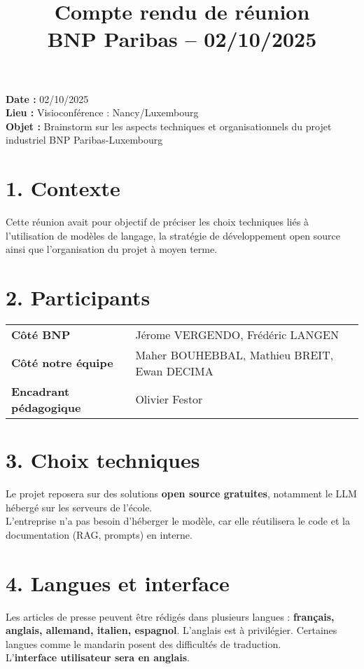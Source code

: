 \documentclass[a4paper,11pt]{article}
\title{\LARGE Compte rendu de réunion \\ \large BNP Paribas – 02/10/2025}
\date{}
\begin{document}
\maketitle

\begin{tcolorbox}[colback=blue!5!white,colframe=blue!75!black,title=Informations générales]
\textbf{Date :} 02/10/2025 \\
\textbf{Lieu :} Visioconférence : Nancy/Luxembourg \\
\textbf{Objet :} Brainstorm sur les aspects techniques et organisationnels du projet industriel BNP Paribas-Luxembourg
\end{tcolorbox}

\vspace{0.5cm}

\section*{1. Contexte}
Cette réunion avait pour objectif de préciser les choix techniques liés à l’utilisation de modèles de langage, la stratégie de développement open source ainsi que l’organisation du projet à moyen terme.

\section*{2. Participants}
\begin{tcolorbox}[colback=gray!5!white,colframe=black!75!black,title=Participants]
\begin{tabular}{>{\bfseries}l l}
Côté BNP & Jérome VERGENDO, Frédéric LANGEN \\
Côté notre équipe & Maher BOUHEBBAL, Mathieu BREIT, Ewan DECIMA \\
Encadrant pédagogique & Olivier Festor
\end{tabular}
\end{tcolorbox}

\section*{3. Choix techniques}
Le projet reposera sur des solutions \textbf{open source gratuites}, notamment le LLM hébergé sur les serveurs de l'école. \\
L’entreprise n’a pas besoin d’héberger le modèle, car elle réutilisera le code et la documentation (RAG, prompts) en interne. 

\section*{4. Langues et interface}
Les articles de presse peuvent être rédigés dans plusieurs langues : \textbf{français, anglais, allemand, italien, espagnol}. L’anglais est à privilégier. Certaines langues comme le mandarin posent des difficultés de traduction. \\
L’\textbf{interface utilisateur sera en anglais}.
\end{document}

